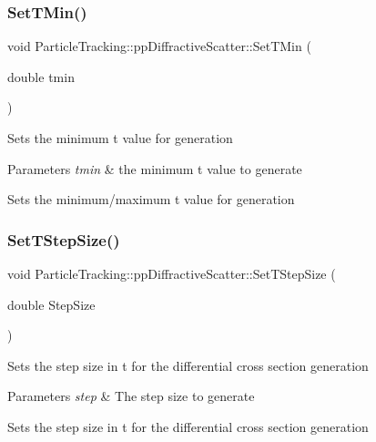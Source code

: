 \subsubsection{\texorpdfstring{Set\+T\+Min()}{SetTMin()}}
{\footnotesize\ttfamily void Particle\+Tracking\+::pp\+Diffractive\+Scatter\+::\+Set\+T\+Min (\begin{DoxyParamCaption}\item[{double}]{tmin }\end{DoxyParamCaption})}

Sets the minimum t value for generation 
\begin{DoxyParams}{Parameters}
{\em tmin} & the minimum t value to generate\\
\hline
\end{DoxyParams}
Sets the minimum/maximum t value for generation \mbox{\label{classParticleTracking_1_1ppDiffractiveScatter_a19f9d33319193a4dab8e50c48fd72d7a}} 
\subsubsection{\texorpdfstring{Set\+T\+Step\+Size()}{SetTStepSize()}}
{\footnotesize\ttfamily void Particle\+Tracking\+::pp\+Diffractive\+Scatter\+::\+Set\+T\+Step\+Size (\begin{DoxyParamCaption}\item[{double}]{Step\+Size }\end{DoxyParamCaption})}

Sets the step size in t for the differential cross section generation 
\begin{DoxyParams}{Parameters}
{\em step} & The step size to generate\\
\hline
\end{DoxyParams}
Sets the step size in t for the differential cross section generation \mbox{\label{classParticleTracking_1_1ppDiffractiveScatter_acfd8385c3ee1f3e710a1c7ef15183039}} 
